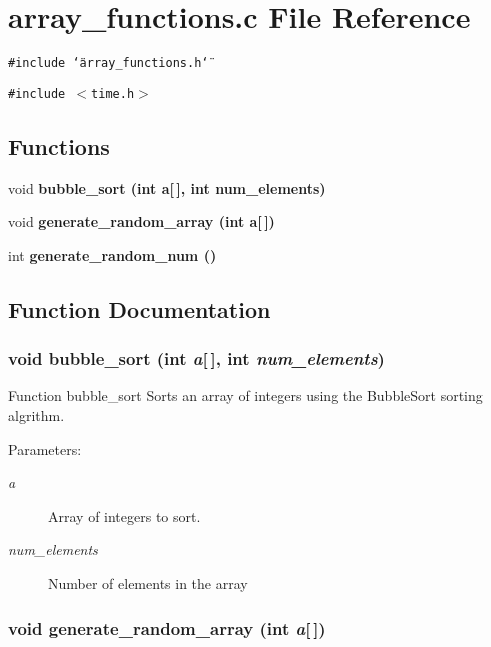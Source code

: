 \section{array\_\-functions.c File Reference}
\label{array__functions_8c}
{\tt \#include \char`\"{}array\_\-functions.h\char`\"{}}\par
{\tt \#include $<$time.h$>$}\par
\subsection*{Functions}
\begin{CompactItemize}
\item 
void \bf{bubble\_\-sort} (int a[$\,$], int num\_\-elements)
\item 
void \bf{generate\_\-random\_\-array} (int a[$\,$])
\item 
int \bf{generate\_\-random\_\-num} ()
\end{CompactItemize}


\subsection{Function Documentation}
\subsubsection{\setlength{\rightskip}{0pt plus 5cm}void bubble\_\-sort (int {\em a}[$\,$], int {\em num\_\-elements})}\label{array__functions_8c_8a1a6deeb7038b908107983dcfb437f5}


Function bubble\_\-sort Sorts an array of integers using the Bubble\-Sort sorting algrithm. \begin{Desc}
\item[Parameters:]
\begin{description}
\item[{\em a}]Array of integers to sort. \item[{\em num\_\-elements}]Number of elements in the array \end{description}
\end{Desc}
\subsubsection{\setlength{\rightskip}{0pt plus 5cm}void generate\_\-random\_\-array (int {\em a}[$\,$])}\label{array__functions_8c_c2fca152a8500c2340830c4f8fdfd4a6}


